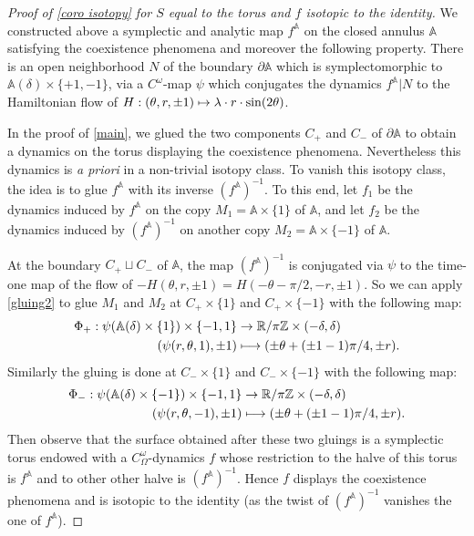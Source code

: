 \documentclass[11pt]{article}
\newcommand\mto{\mathchoice{\longmapsto}{\mapsto}{\mapsto}{\mapsto}}
\newcommand\A{\mathbb A}
\newcommand\R{\mathbb R}
\newcommand\Z{\mathbb Z}
\theoremstyle{definition}
\begin{document}
\begin{proof}[Proof of \cref{coro isotopy} for $S$ equal to the torus and $f$ isotopic to the identity]
We constructed above a symplectic and analytic map $f^\A$ on the closed annulus $\A $ satisfying the coexistence phenomena and moreover the following property.
There is an open neighborhood $N$ of the boundary $\partial \A$ which is symplectomorphic to $\A(\delta)\times \{+1,-1\}$, via a $C^\omega$-map $ \psi$ which conjugates the dynamics $f^\A|N$ to the Hamiltonian flow of $H: (\theta,r, \pm1)\mto \lambda\cdot r\cdot \sin(2\theta)$.

In the proof of \cref{main}, we glued the two components $C_+$ and $C_-$ of $\partial \A$ to obtain a dynamics on the torus displaying the coexistence phenomena. Nevertheless this dynamics is \emph{a priori} in a non-trivial isotopy class. To vanish this isotopy class, the idea is to glue $f^\A$ with its inverse $(f^\A)^{-1}$. To this end, let $f_1$ be the dynamics induced by $f^\A$ on the copy
$M_1=\A\times \{1\}$ of $\A$, and let $f_2 $ be the dynamics induced by $(f^\A)^{-1}$ on another copy
$M_2=\A\times \{-1\}$ of $\A$.

At the boundary $C_+\sqcup C_-$ of $\A$, the map $(f^\A)^{-1}$ is conjugated via $\psi$ to the time-one map of the flow of $-H(\theta, r,\pm1)= H(-\theta -\pi/2, -r,\pm1)$. So we can apply \cref{gluing2} to glue $M_1$ and $M_2$ at $C_+\times \{1\}$ and $C_+\times \{-1\}$ with the following map:
\begin{align*}
\Phi_+: \psi(\A(\delta)\times \{1\})\times \{-1,1\}&\to \R/\pi\Z\times (-\delta,\delta)\\
(\psi(r,\theta,1),\pm1) &\mto (\pm \theta+(\pm1-1)\pi/4,\pm r).
\end{align*}
Similarly the gluing is done at $C_-\times \{1\}$ and $C_-\times \{-1\}$ with the following map:
\begin{align*}
\Phi_-:\psi(\A(\delta)\times \{-1\})\times \{-1,1\}&\to \R/\pi\Z\times (-\delta,\delta)\\
(\psi(r,\theta,-1),\pm1) &\mto (\pm \theta+(\pm1-1)\pi/4,\pm r).
\end{align*}
Then observe that the surface obtained after these two gluings is a symplectic torus endowed with a $C^\omega_\Omega$-dynamics $f$ whose restriction to the halve of this torus is $f^\A$ and to other other halve is $(f^\A)^{-1}$. Hence $f$ displays the coexistence phenomena and is isotopic to the identity (as the twist of $(f^\A)^{-1}$ vanishes the one of $f^\A$).
\end{proof}
\end{document}
